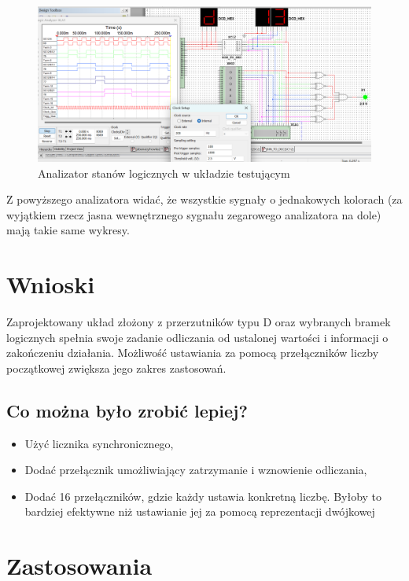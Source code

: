 \documentclass{article}
\begin{document}
    \begin{figure}[H]
        \centering
        \captionsetup{font=small, skip=2pt}
        \includegraphics[scale=0.5]{images/analizator_test}
        \caption{Analizator stanów logicznych w układzie testującym}
    \end{figure}
    Z powyższego analizatora widać, że wszystkie sygnały o jednakowych kolorach (za wyjątkiem rzecz jasna
    wewnętrznego sygnału zegarowego analizatora na dole) mają takie same wykresy. 

    \section{Wnioski}
    Zaprojektowany układ złożony z przerzutników typu D oraz wybranych bramek logicznych spełnia swoje zadanie
    odliczania od ustalonej wartości i informacji o zakończeniu działania. Możliwość ustawiania za pomocą
    przełączników liczby początkowej zwiększa jego zakres zastosowań.
    \subsection*{Co można było zrobić lepiej?}
    \begin{itemize}
        \item Użyć licznika synchronicznego,
        \item Dodać przełącznik umożliwiający zatrzymanie i wznowienie odliczania,
        \item Dodać 16 przełączników, gdzie każdy ustawia konkretną liczbę. Byłoby to bardziej efektywne niż
            ustawianie jej za pomocą reprezentacji dwójkowej
    \end{itemize}

    \section{Zastosowania}
\end{document}

